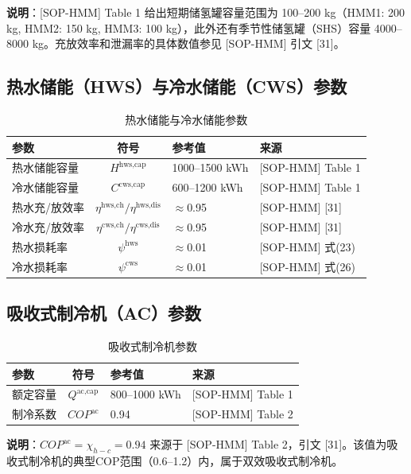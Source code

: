 \documentclass[11pt]{ctexart}
\begin{document}
\textbf{说明}：{[SOP-HMM]} Table 1 给出短期储氢罐容量范围为 100--200 kg（HMM1: 200 kg, HMM2: 150 kg, HMM3: 100 kg），此外还有季节性储氢罐（SHS）容量 4000--8000 kg。充放效率和泄漏率的具体数值参见 {[SOP-HMM]} 引文 {[31]}。

\subsection{热水储能（HWS）与冷水储能（CWS）参数}

\begin{table}[htbp]
\centering
\caption{热水储能与冷水储能参数}
\begin{tabular}{lcll}
\hline
参数 & 符号 & 参考值 & 来源 \\
\hline
热水储能容量 & $H^{\text{hws,cap}}$ & 1000--1500 kWh & {[SOP-HMM]} Table 1 \\
冷水储能容量 & $C^{\text{cws,cap}}$ & 600--1200 kWh & {[SOP-HMM]} Table 1 \\
热水充/放效率 & $\eta^{\text{hws,ch}}/\eta^{\text{hws,dis}}$ & $\approx$0.95 & {[SOP-HMM]} {[31]} \\
冷水充/放效率 & $\eta^{\text{cws,ch}}/\eta^{\text{cws,dis}}$ & $\approx$0.95 & {[SOP-HMM]} {[31]} \\
热水损耗率 & $\psi^{\text{hws}}$ & $\approx$0.01 & {[SOP-HMM]} 式(23) \\
冷水损耗率 & $\psi^{\text{cws}}$ & $\approx$0.01 & {[SOP-HMM]} 式(26) \\
\hline
\end{tabular}
\end{table}

\subsection{吸收式制冷机（AC）参数}

\begin{table}[htbp]
\centering
\caption{吸收式制冷机参数}
\begin{tabular}{lcll}
\hline
参数 & 符号 & 参考值 & 来源 \\
\hline
额定容量 & $Q^{\text{ac,cap}}$ & 800--1000 kWh & {[SOP-HMM]} Table 1 \\
制冷系数 & $COP^{\text{ac}}$ & 0.94 & {[SOP-HMM]} Table 2 \\
\hline
\end{tabular}
\end{table}

\textbf{说明}：$COP^{\text{ac}}=\chi_{h-c}=0.94$ 来源于 {[SOP-HMM]} Table 2，引文 {[31]}。该值为吸收式制冷机的典型COP范围（0.6--1.2）内，属于双效吸收式制冷机。
\end{document}
